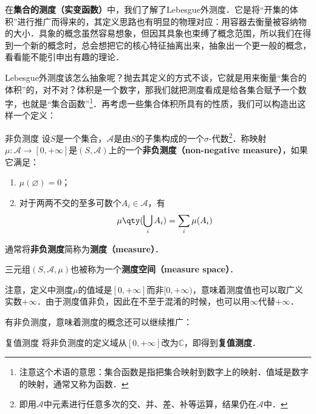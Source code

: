 

在\textbf{集合的测度（实变函数）}中，我们了解了Lebesgue外测度．它是将“开集的体积”进行推广而得来的，其定义思路也有明显的物理对应：用容器去衡量被容纳物的大小．具象的概念虽然容易想象，但因其具象也束缚了概念范围，所以我们在得到一个新的概念时，总会想把它的核心特征抽离出来，抽象出一个更一般的概念，看看能不能引申出有趣的理论．

Lebesgue外测度该怎么抽象呢？抛去其定义的方式不谈，它就是用来衡量“集合的体积”的，对不对？体积是一个数字，那我们就把测度看成是给各集合赋予一个数字，也就是“集合函数”\footnote{注意这个术语的意思：集合函数是指把集合映射到数字上的映射．值域是数字的映射，通常又称为函数．}．再考虑一些集合体积所具有的性质，我们可以构造出这样一个定义：

\begin{definition}{非负测度}\label{GenFun_def1}
设$S$是一个集合，$\mathcal{A}$是由$S$的子集构成的一个$\sigma$-代数\footnote{即用$\mathcal{A}$中元素进行任意多次的交、并、差、补等运算，结果仍在$\mathcal{A}$中．}．称映射$\mu:\mathcal{A}\to [0, +\infty]$是$(S, \mathcal{A})$上的一个\textbf{非负测度（non-negative measure）}，如果它满足：
\begin{enumerate}
\item $\mu(\varnothing)=0$；\\
\item 对于两两不交的至多可数个$A_i\in\mathcal{A}$，有
\begin{equation}
\mu\qty(\bigcup_i A_i) = \sum_i \mu(A_i)
\end{equation}
\end{enumerate}

通常将\textbf{非负测度}简称为\textbf{测度（measure）}．

三元组$(S, \mathcal{A}, \mu)$也被称为一个\textbf{测度空间（measure space）}．

\end{definition}

注意，定义中测度$\mu$的值域是$[0, +\infty]$而非$[0, +\infty)$，意味着测度值也可以取广义实数$+\infty$．由于测度值非负，因此在不至于混淆的时候，也可以用$\infty$代替$+\infty$．

有非负测度，意味着测度的概念还可以继续推广：

\begin{definition}{复值测度}
将非负测度的定义域从$[0, +\infty]$改为$\mathbb{C}$，即得到\textbf{复值测度}．
\end{definition}

